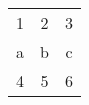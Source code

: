 \documentclass{article}
\begin{document}
\begin{tabular}{|c|c|c|}
1 & 2 & 3 \\
a & b & c \\
4 & 5 & 6 \\
\end{tabular}
\end{document}
